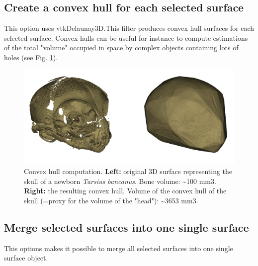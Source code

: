 \subsection{Create a convex hull for each selected surface}
This option uses vtkDelaunay3D.This filter produces convex hull surfaces for each selected surface. Convex hulls can be useful for instance to compute estimations of the total "volume" occupied in space by complex objects containing lots of holes (see Fig. \ref{convex_hull}). 

\begin{figure}
  \centering
  \includegraphics[scale=0.27]{images/09/structure/convex_hull.png} 
	\caption{Convex hull computation. \textbf{Left:} original 3D surface representing the skull of a newborn \textit{Tarsius bancanus}. Bone volume: \textasciitilde100 mm3. \textbf{Right:} the resulting convex hull. Volume of the convex hull of the skull (=proxy for the volume of the "head"): \textasciitilde3653 mm3.}
\label{convex_hull}
 
\end{figure}

\subsection{Merge selected surfaces into one single surface}
This options makes it possible to merge all selected surfaces into one single surface object. 

